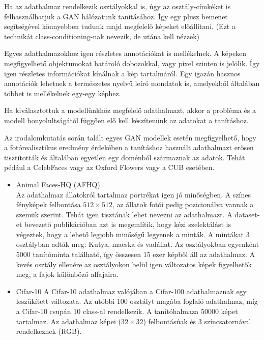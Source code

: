 Ha az adathalmaz rendelkezik osztályokkal is, úgy az osztály-címkéket is felhasználhatjuk a GAN hálózatunk tanításához. Így egy plusz bemenet segítségével könnyebben tudunk majd megfelelő képeket előállítani. (Ezt a technikát class-conditioning-nak nevezik, de utána kell nézzek)

Egyes adathalmazokhoz igen részletes annotációkat is mellékelnek. A képeken megfigyelhető objektumokat határoló dobozokkal, vagy pixel szinten is jelölik. Így igen részletes információkat kínálnak a kép tartalmáról. Egy igazán hasznos annotációk lehetnek a természetes nyelvű leíró mondatok is, amelyekből általában többet is mellékelnek egy-egy képhez.

Ha kiválasztottuk a modellünkhöz megfelelő adathalmazt, akkor a probléma és a modell bonyolultságától függően elő kell készítenünk az adatokat a tanításhoz.

Az irodalomkutatás során talált egyes GAN modellek esetén megfigyelhető, hogy a fotórealisztikus eredmény érdekében a tanításhoz használt adathalmazt erősen tisztították és általában egyetlen egy doménból származnak az adatok. Tehát pédául a CelebFaces vagy az Oxford Flowers vagy a CUB esetében.


\begin{itemize}
	\item Animal Faces-HQ (AFHQ) \cite{choi2020stargan}\\
		Az adathalmaz állatokról tartalmaz portrékat igen jó minőségben. A színes fényképek felbontása $ 512 \times 512 $, az állatok fotói pedig pozicionálva vannak a szemük szerint. Tehát igen tisztának lehet nevezni az adathalmazt. A dataset-et bevezető publikációban azt is megemlítik, hogy kézi szelektálást is végeztek, hogy a lehető legjobb minőségű legyenek a minták. A mintákat 3 osztályban adták meg: Kutya, macska és vadállat. Az osztályokban egyenként 5000 tanítóminta található, így összesen 15 ezer képből áll az adathalmaz. A kevés osztály ellenére az osztályokon belül igen változatos képek figyelhetők meg, a fajok különböző alfajaira.
	\item Cifar-10 \cite{krizhevsky2009learning}
		A Cifar-10 adathalmaz valójában a Cifar-100 adathalmaznak egy leszűkített változata. Az utóbbi 100 osztályt magába foglaló adathalmaz, míg a Cifar-10 csupán 10 class-al rendelkezik. A tanítóhalmaza 50000 képet tartalmaz.
		Az adathalmaz képei ($32 \times 32$) felbontásúak és 3 színcsatornával rendelkeznek (RGB).
\end{itemize}
